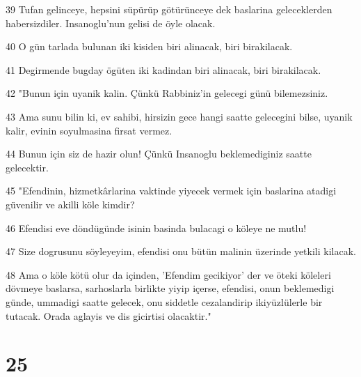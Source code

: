 \par 39 Tufan gelinceye, hepsini süpürüp götürünceye dek baslarina geleceklerden habersizdiler. Insanoglu'nun gelisi de öyle olacak.
\par 40 O gün tarlada bulunan iki kisiden biri alinacak, biri birakilacak.
\par 41 Degirmende bugday ögüten iki kadindan biri alinacak, biri birakilacak.
\par 42 "Bunun için uyanik kalin. Çünkü Rabbiniz'in gelecegi günü bilemezsiniz.
\par 43 Ama sunu bilin ki, ev sahibi, hirsizin gece hangi saatte gelecegini bilse, uyanik kalir, evinin soyulmasina firsat vermez.
\par 44 Bunun için siz de hazir olun! Çünkü Insanoglu beklemediginiz saatte gelecektir.
\par 45 "Efendinin, hizmetkârlarina vaktinde yiyecek vermek için baslarina atadigi güvenilir ve akilli köle kimdir?
\par 46 Efendisi eve döndügünde isinin basinda bulacagi o köleye ne mutlu!
\par 47 Size dogrusunu söyleyeyim, efendisi onu bütün malinin üzerinde yetkili kilacak.
\par 48 Ama o köle kötü olur da içinden, 'Efendim gecikiyor' der ve öteki köleleri dövmeye baslarsa, sarhoslarla birlikte yiyip içerse, efendisi, onun beklemedigi günde, ummadigi saatte gelecek, onu siddetle cezalandirip ikiyüzlülerle bir tutacak. Orada aglayis ve dis gicirtisi olacaktir."

\chapter{25}

